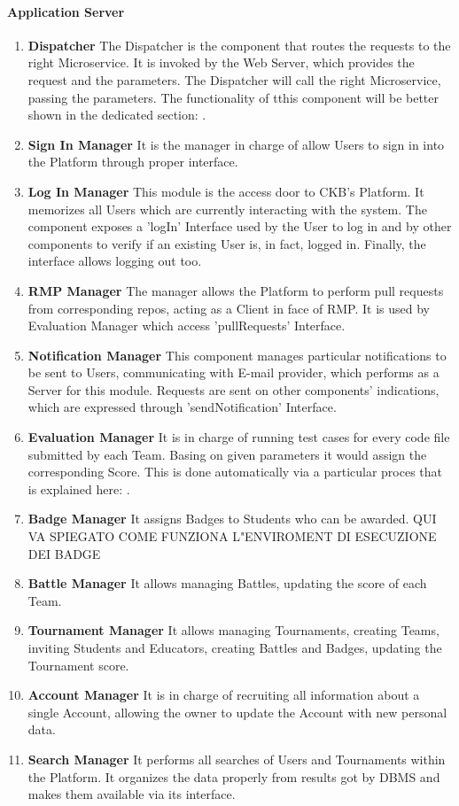 \paragraph{Application Server}
\begin{enumerate}
    \item \textbf{Dispatcher} The Dispatcher is the component that routes the requests to the right Microservice. It is invoked by the Web Server, which provides the request and the parameters. The Dispatcher will call the right Microservice, passing the parameters. The functionality of tthis component will be better shown in the dedicated section: .
    \item \textbf{Sign In Manager} It is the manager in charge of allow Users to sign in into the Platform through proper interface.
    \item \textbf{Log In Manager} This module is the access door to CKB's Platform. It memorizes all Users which are currently interacting with the system. The component exposes a 'logIn' Interface used by the User to log in 
    and by other components to verify if an existing User is, in fact, logged in. Finally, the interface allows logging out too.
    \item \textbf{RMP Manager} The manager allows the Platform to perform pull requests from corresponding repos, acting as a Client in face of RMP. It is used by Evaluation Manager which access 'pullRequests' Interface.
    \item \textbf{Notification Manager} This component manages particular notifications to be sent to Users, communicating with E-mail provider, which performs as a Server for this module. Requests are sent on other 
    components' indications, which are expressed through 'sendNotification' Interface.
    \item \textbf{Evaluation Manager} It is in charge of running test cases for every code file submitted by each Team. Basing on given parameters it would assign the corresponding Score. This is done automatically via a particular proces that is explained here: .
    \item \textbf{Badge Manager} It assigns Badges to Students who can be awarded.
    QUI VA SPIEGATO COME FUNZIONA L"ENVIROMENT DI ESECUZIONE DEI BADGE
    \item \textbf{Battle Manager} It allows managing Battles, updating the score of each Team.
    \item \textbf{Tournament Manager} It allows managing Tournaments, creating Teams, inviting Students and Educators, creating Battles and Badges, updating the Tournament score.
    \item \textbf{Account Manager} It is in charge of recruiting all information about a single Account, allowing the owner to update the Account with new personal data.
    \item \textbf{Search Manager} It performs all searches of Users and Tournaments within the Platform. It organizes the data properly from results got by DBMS and makes them available via its interface.
\end{enumerate}
